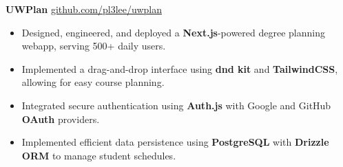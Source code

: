 \textbf{UWPlan} \hfill \href{https://github.com/pl3lee/uwplan}{github.com/pl3lee/uwplan} \\
\vspace{-9pt}
\begin{itemize}
  \item Designed, engineered, and deployed a \textbf{Next.js}-powered degree planning webapp, serving 500+ daily users.
  \item Implemented a drag-and-drop interface using \textbf{dnd kit} and \textbf{TailwindCSS}, allowing for easy course planning.
  \item Integrated secure authentication using \textbf{Auth.js} with Google and GitHub \textbf{OAuth} providers.
  \item Implemented efficient data persistence using \textbf{PostgreSQL} with \textbf{Drizzle ORM} to manage student schedules.
\end{itemize}